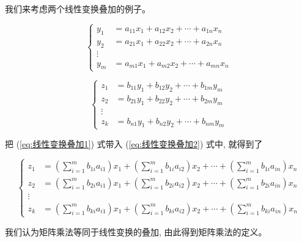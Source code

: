 \documentclass{ctexart}
\begin{document}
    我们来考虑两个线性变换叠加的例子。

    \begin{equation}
        \label {eq:线性变换叠加1}
        \left \{
        \begin{aligned}
            y_1 &= a_{11}x_1 + a_{12}x_2 + \cdots + a_{1n}x_n \\
            y_2 &= a_{21}x_1 + a_{22}x_2 + \cdots + a_{2n}x_n \\
            \vdots \\
            y_m &= a_{m1}x_1 + a_{m2}x_2 + \cdots + a_{mn}x_n
        \end{aligned}
        \right .
    \end{equation}

    \begin{equation}
        \label {eq:线性变换叠加2}
        \left \{
        \begin{aligned}
            z_1 &= b_{11}y_1 + b_{12}y_2 + \cdots + b_{1m}y_m \\
            z_2 &= b_{21}y_1 + b_{22}y_2 + \cdots + b_{2m}y_m \\
            \vdots \\
            z_k &= b_{n1}y_1 + b_{n2}y_2 + \cdots + b_{nm}y_m
        \end{aligned}
        \right .
    \end{equation}

    把 (\ref{eq:线性变换叠加1}) 式带入 (\ref{eq:线性变换叠加2}) 式中, 就得到了

    \begin{equation}
        \label {eq:线性变换叠加3}
        \left \{
        \begin{aligned}
            z_1 &= (\sum_{i=1}^{m} b_{1i}a_{i1})x_1 + (\sum_{i=1}^{m} b_{1i}a_{i2})x_2 + \cdots + (\sum_{i=1}^{m} b_{1i}a_{in})x_n \\
            z_2 &= (\sum_{i=1}^{m} b_{2i}a_{i1})x_1 + (\sum_{i=1}^{m} b_{2i}a_{i2})x_2 + \cdots + (\sum_{i=1}^{m} b_{2i}a_{in})x_n \\
            \vdots \\
            z_k &= (\sum_{i=1}^{m} b_{ki}a_{i1})x_1 + (\sum_{i=1}^{m} b_{ki}a_{i2})x_2 + \cdots + (\sum_{i=1}^{m} b_{ki}a_{in})x_n
        \end{aligned}
        \right .
    \end{equation}

    我们认为矩阵乘法等同于线性变换的叠加, 由此得到矩阵乘法的定义。
\end{document}
